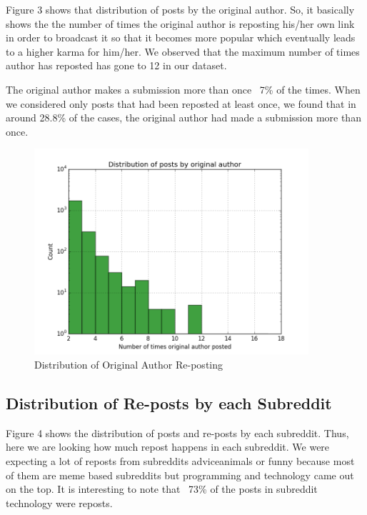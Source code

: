 \documentclass{article} %
\begin{document}
Figure 3 shows that distribution of posts by the original author. So, it basically shows the the number of times the original author is reposting his/her own link in order to broadcast it so that it becomes more popular which eventually leads to a higher karma for him/her. We observed that the maximum number of times author has reposted has gone to 12 in our dataset.

The original author makes a submission more than once  ~7\% of the times. When we considered only posts that had been reposted at least once, we found that in around 28.8\% of the cases, the original author had made a submission more than once. 

\begin{figure}[h]
\begin{center}
\includegraphics[width=4.0in]{original_author.png}
\caption{Distribution of Original Author Re-posting}
\end{center}
\end{figure}

\newpage

\subsection{Distribution of Re-posts by each Subreddit}

Figure 4 shows the distribution of posts and re-posts by each subreddit. Thus, here we are looking how much repost happens in each subreddit. We were expecting a lot of reposts from subreddits adviceanimals or funny because most of them are meme based subreddits but programming and technology came out on the top. 
It is interesting to note that ~73\% of the posts in subreddit technology were reposts. 
\end{document}
